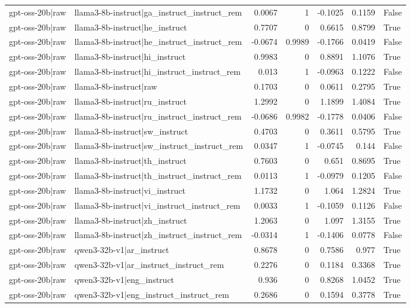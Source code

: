 \begin{table}
\begin{tabular}{l l r r r r l}
gpt-oss-20b|raw & llama3-8b-instruct|ga_instruct_instruct_rem & 0.0067 & 1 & -0.1025 & 0.1159 & False \\
gpt-oss-20b|raw & llama3-8b-instruct|he_instruct & 0.7707 & 0 & 0.6615 & 0.8799 & True \\
gpt-oss-20b|raw & llama3-8b-instruct|he_instruct_instruct_rem & -0.0674 & 0.9989 & -0.1766 & 0.0419 & False \\
gpt-oss-20b|raw & llama3-8b-instruct|hi_instruct & 0.9983 & 0 & 0.8891 & 1.1076 & True \\
gpt-oss-20b|raw & llama3-8b-instruct|hi_instruct_instruct_rem & 0.013 & 1 & -0.0963 & 0.1222 & False \\
gpt-oss-20b|raw & llama3-8b-instruct|raw & 0.1703 & 0 & 0.0611 & 0.2795 & True \\
gpt-oss-20b|raw & llama3-8b-instruct|ru_instruct & 1.2992 & 0 & 1.1899 & 1.4084 & True \\
gpt-oss-20b|raw & llama3-8b-instruct|ru_instruct_instruct_rem & -0.0686 & 0.9982 & -0.1778 & 0.0406 & False \\
gpt-oss-20b|raw & llama3-8b-instruct|sw_instruct & 0.4703 & 0 & 0.3611 & 0.5795 & True \\
gpt-oss-20b|raw & llama3-8b-instruct|sw_instruct_instruct_rem & 0.0347 & 1 & -0.0745 & 0.144 & False \\
gpt-oss-20b|raw & llama3-8b-instruct|th_instruct & 0.7603 & 0 & 0.651 & 0.8695 & True \\
gpt-oss-20b|raw & llama3-8b-instruct|th_instruct_instruct_rem & 0.0113 & 1 & -0.0979 & 0.1205 & False \\
gpt-oss-20b|raw & llama3-8b-instruct|vi_instruct & 1.1732 & 0 & 1.064 & 1.2824 & True \\
gpt-oss-20b|raw & llama3-8b-instruct|vi_instruct_instruct_rem & 0.0033 & 1 & -0.1059 & 0.1126 & False \\
gpt-oss-20b|raw & llama3-8b-instruct|zh_instruct & 1.2063 & 0 & 1.097 & 1.3155 & True \\
gpt-oss-20b|raw & llama3-8b-instruct|zh_instruct_instruct_rem & -0.0314 & 1 & -0.1406 & 0.0778 & False \\
gpt-oss-20b|raw & qwen3-32b-v1|ar_instruct & 0.8678 & 0 & 0.7586 & 0.977 & True \\
gpt-oss-20b|raw & qwen3-32b-v1|ar_instruct_instruct_rem & 0.2276 & 0 & 0.1184 & 0.3368 & True \\
gpt-oss-20b|raw & qwen3-32b-v1|eng_instruct & 0.936 & 0 & 0.8268 & 1.0452 & True \\
gpt-oss-20b|raw & qwen3-32b-v1|eng_instruct_instruct_rem & 0.2686 & 0 & 0.1594 & 0.3778 & True \\

\end{tabular}
\end{table}
